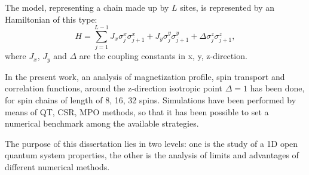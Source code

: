 \documentclass[paper=a4, fontsize=11pt]{scrartcl}	%
\numberwithin{equation}{section}		%
\numberwithin{figure}{section}			%
\numberwithin{table}{section}				%
\begin{document}
The model, representing a chain made up by $L$ sites, is represented by an Hamiltonian of this type:
\begin{equation*}
    H = \sum_{j = 1}^{L-1} J_x\sigma_j^x\sigma_{j+1}^x + J_y\sigma_j^y \sigma_{j+1}^y + \Delta \sigma_j^z \sigma_{j+1}^z,
\end{equation*}
where $J_x$, $J_y$ and $\Delta$ are the coupling constants in x, y, z-direction.

In the present work, an analysis of magnetization profile, spin transport and correlation functions, around the z-direction isotropic point $\Delta = 1$ has been done, for spin chains of length of 8, 16, 32 spins. Simulations have been performed by means of QT, CSR, MPO methods, so that it has been possible to set a numerical benchmark among the available strategies.

The purpose of this dissertation lies in two levels: one is the study of a 1D open quantum system properties, the other is the analysis of limits and advantages of different numerical methods.
\end{document}
